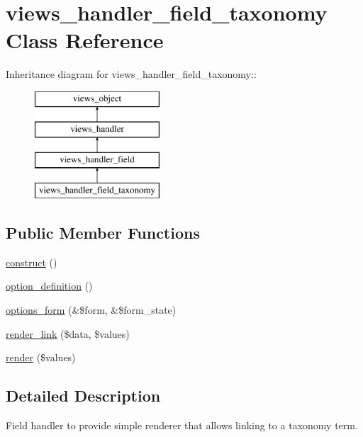 \hypertarget{classviews__handler__field__taxonomy}{
\section{views\_\-handler\_\-field\_\-taxonomy Class Reference}
\label{classviews__handler__field__taxonomy}
}
Inheritance diagram for views\_\-handler\_\-field\_\-taxonomy::\begin{figure}[H]
\begin{center}
\leavevmode
\includegraphics[height=4cm]{classviews__handler__field__taxonomy}
\end{center}
\end{figure}
\subsection*{Public Member Functions}
\begin{CompactItemize}
\item 
\hyperlink{classviews__handler__field__taxonomy_7020806fbe7b4b7c182c422dd327b0fc}{construct} ()
\item 
\hyperlink{classviews__handler__field__taxonomy_c32837e44167ccaf8901f9782298c75b}{option\_\-definition} ()
\item 
\hyperlink{classviews__handler__field__taxonomy_df66d3026b9409dd3237c5ebef994595}{options\_\-form} (\&\$form, \&\$form\_\-state)
\item 
\hyperlink{classviews__handler__field__taxonomy_eeaf9833824a87e8fe2717880dc389af}{render\_\-link} (\$data, \$values)
\item 
\hyperlink{classviews__handler__field__taxonomy_02a50e2e97c9faf4e86c5461edf5d547}{render} (\$values)
\end{CompactItemize}


\subsection{Detailed Description}
Field handler to provide simple renderer that allows linking to a taxonomy term. 


